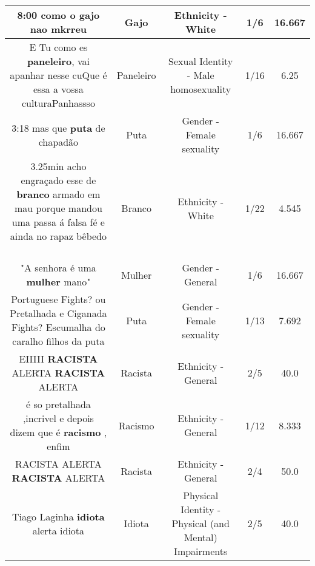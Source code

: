 \documentclass[11pt]{article}
\newlength\mylength
\begin{document}
\begin{center}
\begin{longtable}{|C{.65\mylength}|C{.30\mylength}|C{.12\mylength}|C{.12\mylength}|C{.12\mylength}|}
  \small 8:00 como o \textbf{gajo} nao mkrreu\normalsize   & Gajo & Ethnicity - White & 1/6 & 16.667 \\  \hline
  \small E Tu como es \textbf{paneleiro}, vai apanhar nesse cuQue é essa a vossa culturaPanhassso\normalsize   & Paneleiro & Sexual Identity - Male homosexuality & 1/16 & 6.25 \\  \hline
  \small 3:18 mas que \textbf{puta} de chapadão\normalsize   & Puta & Gender - Female sexuality & 1/6 & 16.667 \\  \hline
  \small 3.25min acho engraçado esse de \textbf{branco} armado em mau porque mandou uma passa á falsa fé e ainda no rapaz bêbedo 👏🏼👏🏼\normalsize   & Branco & Ethnicity - White & 1/22 & 4.545 \\  \hline
  \small "A senhora é uma \textbf{mulher} mano"\normalsize   & Mulher & Gender - General & 1/6 & 16.667 \\  \hline
  \small Portuguese Fights? ou Pretalhada e Ciganada Fights? Escumalha do caralho filhos da puta\normalsize   & Puta & Gender - Female sexuality & 1/13 & 7.692 \\  \hline
  \small EIIIII \textbf{RACISTA} ALERTA \textbf{RACISTA} ALERTA\normalsize   & Racista & Ethnicity - General & 2/5 & 40.0 \\  \hline
  \small é so pretalhada ,incrivel e depois dizem que é \textbf{racismo} , enfim\normalsize   & Racismo & Ethnicity - General & 1/12 & 8.333 \\  \hline
  \small RACISTA ALERTA \textbf{RACISTA} ALERTA\normalsize   & Racista & Ethnicity - General & 2/4 & 50.0 \\  \hline
  \small Tiago Laginha \textbf{idiota} alerta idiota\normalsize   & Idiota & Physical Identity - Physical (and Mental) Impairments & 2/5 & 40.0 \\  \hline

\end{longtable}
\end{center}
\end{document}
